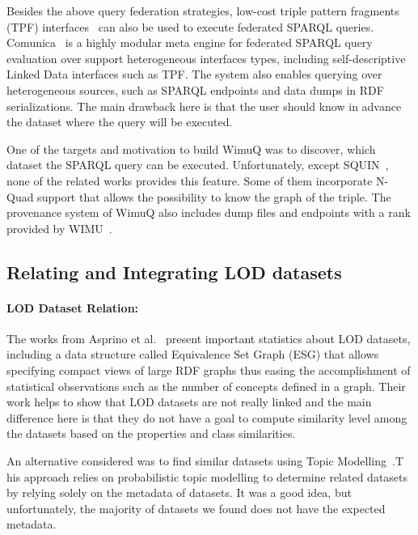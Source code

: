 \documentclass[sw]{iosart2x}
\begin{document}
Besides the above query federation strategies, low-cost triple pattern fragments (TPF) interfaces~\cite{verborgh2016triple} can also be used to execute federated SPARQL queries.
Comunica~\cite{taelman2018comunica} is a highly modular meta engine for federated SPARQL query evaluation over support heterogeneous interfaces types, including self-descriptive Linked Data interfaces such as TPF.
The system also enables querying over heterogeneous sources, such as SPARQL endpoints and data dumps in RDF serializations.
The main drawback here is that the user should know in advance the dataset where the query will be executed.

One of the targets and motivation to build WimuQ was to discover, which dataset the SPARQL query can be executed.
Unfortunately, except SQUIN~\cite{hartig2013squin}, none of the related works provides this feature.
Some of them incorporate N-Quad support that allows the possibility to know the graph of the triple.
The provenance system of WimuQ also includes dump files and endpoints with a rank provided by WIMU~\cite{valdestilhas2018my}.

\subsection{Relating and Integrating LOD datasets} \label{sec:relod_rel}

\paragraph*{\textbf{LOD Dataset Relation:}}
The works from Asprino et al.~\cite{asprino2019linked,asprino2019observing,asprino2019triplifying} present important statistics about LOD datasets, including a data structure called Equivalence Set Graph (ESG) that allows specifying compact views of large RDF graphs thus easing the accomplishment of statistical observations such as the number of concepts defined in a graph.
Their work helps to show that LOD datasets are not really linked and the main difference here is that they do not have a goal to compute similarity level among the datasets based on the properties and class similarities.

An alternative considered was to find similar datasets using Topic Modelling~\cite{roder2016detecting}.T
his approach relies on probabilistic topic modelling to determine related datasets by relying solely on the metadata of datasets.
It was a good idea, but unfortunately, the majority of datasets we found does not have the expected metadata.
\end{document}
